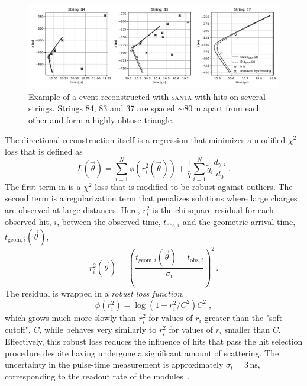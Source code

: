 \begin{figure}
    \centering
    \includegraphics[width=\linewidth]{figures/icecube/reconstruction/santa/multi_string_example_with_cleaning_id_12607962.pdf}
    \caption{Example of a \numucc event reconstructed with \textsc{santa} with hits on several strings. Strings 84, 83 and 37 are spaced $\sim80\,\mathrm{m}$ apart from each other and form a highly obtuse triangle.}
    \label{fig:santa-multi-string-example}
\end{figure}

The directional reconstruction itself is a regression that minimizes a modified $\chi^2$ loss that is defined as
\begin{equation}
L(\vec{\theta})=\sum_{i=1}^{N}\phi(r^2_i(\vec{\theta}))
+
\frac{1}{\bar{q}}\sum_{i=1}^{N}\tilde{q}_i \frac{d_{\gamma,i}}{d_0}\,.\label{eq:chi-square-mod-loss}
\end{equation}
The first term in  is a $\chi^2$ loss that is modified to be robust against outliers. The second term is a regularization term that penalizes solutions where large charges are observed at large distances. Here, $r^2_i$ is the chi-square residual for each observed hit, $i$, between the observed time, $t_{\mathrm{obs}, i}$ and the geometric arrival time, $t_{\mathrm{geom},i}(\vec{\theta})$,
\begin{equation}
r_{i}^{2}(\vec{\theta})=\left(\frac{t_{\mathrm{geom},i}(\vec{\theta})-t_{\mathrm{obs},i}}{\sigma_{t}}\right)^{2}\,.
\end{equation}
The residual is wrapped in a \emph{robust loss function}, 
\begin{equation}
\phi(r_{i}^{2})=\log\left(1+r_{i}^{2}/C^2\right)C^2\;, 
\end{equation}
which grows much more slowly than $r_{i}^{2}$ for values of $r_i$ greater than the "soft cutoff", $C$, while behaves very similarly to $r_i^2$ for values of $r_i$ smaller than $C$.
Effectively, this robust loss reduces the influence of hits that pass the hit selection procedure despite having undergone a significant amount of scattering.
The uncertainty in the pulse-time measurement is approximately $\sigma_{t}=3\,\mathrm{ns}$, corresponding to the readout rate of the modules~\cite{icecube_daq}.

